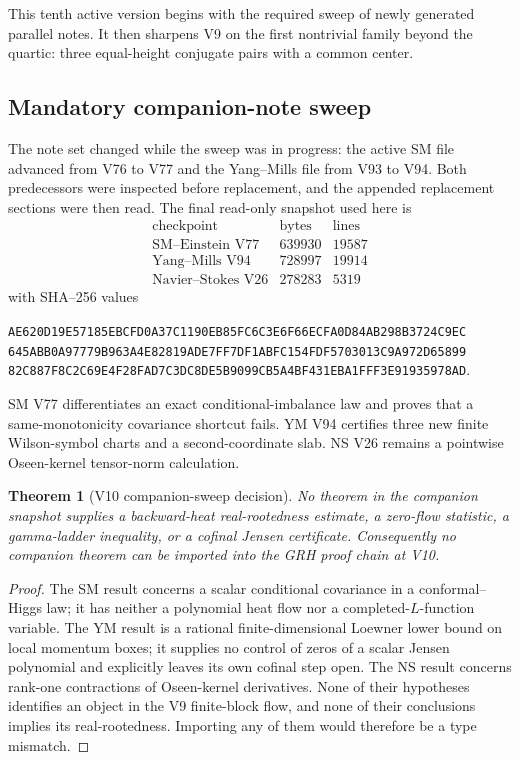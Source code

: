 \documentclass[11pt]{article}
\newtheorem{theorem}{Theorem}[section]
\theoremstyle{definition}
\theoremstyle{remark}
\begin{document}
This tenth active version begins with the required sweep of newly generated
parallel notes.  It then sharpens V9 on the first nontrivial family beyond
the quartic: three equal-height conjugate pairs with a common center.

\subsection{Mandatory companion-note sweep}

The note set changed while the sweep was in progress: the active SM file
advanced from V76 to V77 and the Yang--Mills file from V93 to V94.  Both
predecessors were inspected before replacement, and the appended replacement
sections were then read.  The final read-only snapshot used here is
\[
\begin{array}{c|r|r}
\text{checkpoint}&\text{bytes}&\text{lines}\\ \hline
\text{SM--Einstein V77}&639930&19587\\
\text{Yang--Mills V94}&728997&19914\\
\text{Navier--Stokes V26}&278283&5319
\end{array}
\tag{N10.1}
\]
with SHA--256 values
\begin{center}\scriptsize
\texttt{AE620D19E57185EBCFD0A37C1190EB85FC6C3E6F66ECFA0D84AB298B3724C9EC}\\
\texttt{645ABB0A97779B963A4E82819ADE7FF7DF1ABFC154FDF5703013C9A972D65899}\\
\texttt{82C887F8C2C69E4F28FAD7C3DC8DE5B9099CB5A4BF431EBA1FFF3E91935978AD}.
\end{center}

SM V77 differentiates an exact conditional-imbalance law and proves that a
same-monotonicity covariance shortcut fails.  YM V94 certifies three new
finite Wilson-symbol charts and a second-coordinate slab.  NS V26 remains a
pointwise Oseen-kernel tensor-norm calculation.

\begin{theorem}[V10 companion-sweep decision]
\label{thm:f2v10-sweep}
No theorem in the companion snapshot supplies a backward-heat
real-rootedness estimate, a zero-flow statistic, a gamma-ladder inequality,
or a cofinal Jensen certificate.  Consequently no companion theorem can be
imported into the GRH proof chain at V10.
\end{theorem}

\begin{proof}
The SM result concerns a scalar conditional covariance in a conformal--Higgs
law; it has neither a polynomial heat flow nor a completed-\(L\)-function
variable.  The YM result is a rational finite-dimensional Loewner lower
bound on local momentum boxes; it supplies no control of zeros of a scalar
Jensen polynomial and explicitly leaves its own cofinal step open.  The NS
result concerns rank-one contractions of Oseen-kernel derivatives.  None of
their hypotheses identifies an object in the V9 finite-block flow, and none
of their conclusions implies its real-rootedness.  Importing any of them
would therefore be a type mismatch.
\end{proof}
\end{document}
